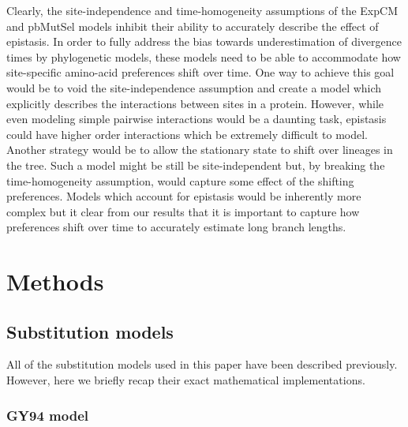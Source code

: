 \documentclass[11pt]{article}
\begin{document}
Clearly, the site-independence and time-homogeneity assumptions of the ExpCM and pbMutSel models inhibit their ability to accurately describe the effect of epistasis.
In order to fully address the bias towards underestimation of divergence times by phylogenetic models, these models need to be able to accommodate how site-specific amino-acid preferences shift over time. 
One way to achieve this goal would be to void the site-independence assumption and create a model which explicitly describes the interactions between sites in a protein. 
However, while even modeling simple pairwise interactions would be a daunting task, epistasis could have higher order interactions which be extremely difficult to model. 
Another strategy would be to allow the stationary state to shift over lineages in the tree. 
Such a model might be still be site-independent but, by breaking the time-homogeneity assumption, would capture some effect of the shifting preferences. 
Models which account for epistasis would be inherently more complex but it clear from our results that it is important to capture how preferences shift over time to accurately estimate long branch lengths.

\section*{Methods}

\subsection*{Substitution models}
All of the substitution models used in this paper have been described previously.
However, here we briefly recap their exact mathematical implementations.

\subsubsection*{GY94 model}
\end{document}
